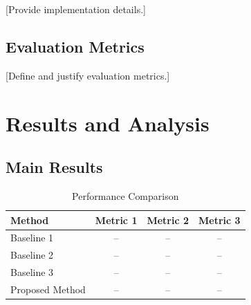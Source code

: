 \documentclass[conference]{IEEEtran}
\begin{document}
[Provide implementation details.]


\subsection{Evaluation Metrics}

%
%
%
%
%

[Define and justify evaluation metrics.]



\section{Results and Analysis}

%


\subsection{Main Results}

\begin{table}[t]
\centering \color{red}
\caption{Performance Comparison}
\label{tab:results}
\begin{tabular}{lccc}
\toprule
\textbf{Method} &
\textbf{Metric 1} &
\textbf{Metric 2} &
\textbf{Metric 3} \\
\midrule

Baseline 1 & -- & -- & -- \\
Baseline 2 & -- & -- & -- \\
Baseline 3 & -- & -- & -- \\
Proposed Method & -- & -- & -- \\

\bottomrule
\end{tabular}
\end{table}


%
%
\end{document}
